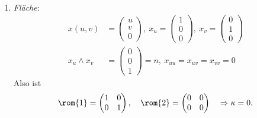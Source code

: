 \begin{example}
  \
  \begin{enumerate}
    \item \emph{Fläche}:
    \begin{align*}
      x(u,v) &= \left( \begin{smallmatrix}
        u \\ v \\ 0
      \end{smallmatrix} \right), \ x_u = \left( \begin{smallmatrix}
        1 \\ 0 \\ 0
      \end{smallmatrix} \right), \ x_v = \left( \begin{smallmatrix}
        0 \\ 1 \\ 0
      \end{smallmatrix} \right) \\
      x_u \wedge x_v &= \left( \begin{smallmatrix}
        0 \\ 0 \\ 1
      \end{smallmatrix} \right) = n, \ x_{uu} = x_{uv} = x_{vv} = 0
    \end{align*}
    Also ist
    \begin{equation*}
      \rom{1} = \begin{pmatrix}
        1 & 0 \\
        0 & 1
      \end{pmatrix}, \quad \rom{2} = \begin{pmatrix}
        0 & 0 \\
        0 & 0
      \end{pmatrix} \quad \Rightarrow \kappa = 0\text{.}
    \end{equation*}


\end{enumerate}
\end{example}

